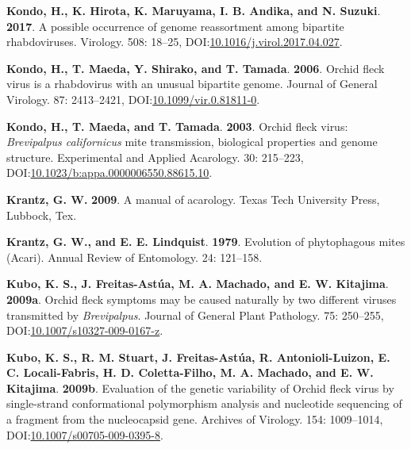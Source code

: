 \documentclass[12pt,final,CPage]{ufthesis}
\newlength{\cslhangindent}
\newenvironment{CSLReferences}[2] %
{%
	\setlength{\parindent}{0pt}
	\ifodd #1 \everypar{\setlength{\hangindent}{\cslhangindent}}\ignorespaces\fi
	\ifnum #2 > 0
	\setlength{\parskip}{#2\baselineskip}
	\fi
}%
{}
\begin{document}
{\begin{CSLReferences}{1}{0}
  \leavevmode{}%
  \textbf{Kondo, H., K. Hirota, K. Maruyama, I. B. Andika, and N. Suzuki}. \textbf{2017}. A possible occurrence of genome reassortment among bipartite rhabdoviruses. Virology. 508: 18--25, DOI:\href{https://doi.org/10.1016/j.virol.2017.04.027}{10.1016/j.virol.2017.04.027}.

  \leavevmode{}%
  \textbf{Kondo, H., T. Maeda, Y. Shirako, and T. Tamada}. \textbf{2006}. {Orchid fleck virus} is a rhabdovirus with an unusual bipartite genome. Journal of General Virology. 87: 2413--2421, DOI:\href{https://doi.org/10.1099/vir.0.81811-0}{10.1099/vir.0.81811-0}.

  \leavevmode{}%
  \textbf{Kondo, H., T. Maeda, and T. Tamada}. \textbf{2003}. {Orchid fleck virus}: {\emph{Brevipalpus californicus}} mite transmission, biological properties and genome structure. Experimental and Applied Acarology. 30: 215--223, DOI:\href{https://doi.org/10.1023/b:appa.0000006550.88615.10}{10.1023/b:appa.0000006550.88615.10}.

  \leavevmode{}%
  \textbf{Krantz, G. W.} \textbf{2009}. A manual of acarology. Texas Tech University Press, Lubbock, Tex.

  \leavevmode{}%
  \textbf{Krantz, G. W., and E. E. Lindquist}. \textbf{1979}. Evolution of phytophagous mites ({Acari}). Annual Review of Entomology. 24: 121--158.

  \leavevmode{}%
  \textbf{Kubo, K. S., J. Freitas-Astúa, M. A. Machado, and E. W. Kitajima}. \textbf{2009a}. {Orchid fleck} symptoms may be caused naturally by two different viruses transmitted by {\emph{Brevipalpus}}. Journal of General Plant Pathology. 75: 250--255, DOI:\href{https://doi.org/10.1007/s10327-009-0167-z}{10.1007/s10327-009-0167-z}.

  \leavevmode{}%
  \textbf{Kubo, K. S., R. M. Stuart, J. Freitas-Astúa, R. Antonioli-Luizon, E. C. Locali-Fabris, H. D. Coletta-Filho, M. A. Machado, and E. W. Kitajima}. \textbf{2009b}. Evaluation of the genetic variability of {Orchid fleck virus} by single-strand conformational polymorphism analysis and nucleotide sequencing of a fragment from the nucleocapsid gene. Archives of Virology. 154: 1009--1014, DOI:\href{https://doi.org/10.1007/s00705-009-0395-8}{10.1007/s00705-009-0395-8}.


\end{CSLReferences}}
\end{document}
